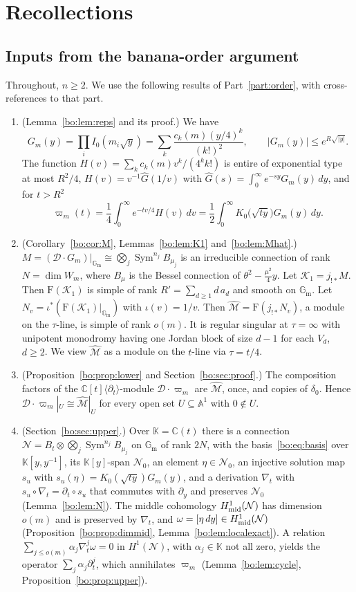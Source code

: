 \documentclass[11pt,a4paper]{article}
\theoremstyle{definition}
\theoremstyle{remark}
\numberwithin{equation}{section}
\newcommand{\C}{\mathbb{C}}
\newcommand{\Gm}{\mathbb{G}_{\mathrm{m}}}
\newcommand{\Kt}{\mathbb{K}}
\newcommand{\A}{\mathbb{A}}
\newcommand{\cD}{\mathcal{D}}
\newcommand{\cN}{\mathcal{N}}
\newcommand{\cM}{\mathcal{M}}
\newcommand{\Four}{\mathrm{F}}
\DeclareMathOperator{\Sym}{Sym}
\newcommand{\cK}{\mathcal{K}}
\newcommand{\Mhat}{\widehat{\cM}}
\begin{document}
\section{Recollections}\label{bs:sec:recall}

\subsection{Inputs from the banana-order argument}\label{bs:sec:partI}
Throughout, $n\ge2$. We use the following results of Part~\ref{part:order}, with cross-references to that part.
\begin{enumerate}
\item[(P1)] (Lemma~\ref{bo:lem:reps} and its proof.) We have
\[
G_m(y)=\prod_iI_0(m_i\sqrt y)=\sum_k\frac{c_k(m)(y/4)^k}{(k!)^2},\qquad |G_m(y)|\le e^{R\sqrt{|y|}}.
\] The function $H(v)=\sum_kc_k(m)v^k/(4^kk!)$ is entire of exponential type at most $R^2/4$, $H(v)=v^{-1}\widehat G(1/v)$ with $\widehat G(s)=\int_0^\infty e^{-sy}G_m(y)\,dy$, and for $t>R^2$
\[
\varpi_m(t)=\frac14\int_0^\infty e^{-tv/4}H(v)\,dv=\frac12\int_0^\infty K_0\bigl(\sqrt{ty}\bigr)G_m(y)\,dy .
\]
\item[(P2)] (Corollary~\ref{bo:cor:M}, Lemmas~\ref{bo:lem:K1} and~\ref{bo:lem:Mhat}.) $M=(\cD\cdot G_m)|_{\Gm}\cong\bigotimes_j\Sym^{n_j}B_{\mu_j}$ is an irreducible connection of rank $N=\dim W_m$, where $B_\mu$ is the Bessel connection of $\theta^2-\frac{\mu^2}{4}y$. Let $\cK_1=j_{!*}M$. Then $\Four(\cK_1)$ is simple of rank $R'=\sum_{d\ge1}d\,a_d$ and smooth on $\Gm$. Let $N_v=\iota^*(\Four(\cK_1)|_{\Gm})$ with $\iota(v)=1/v$. Then $\Mhat=\Four(j_{!*}N_v)$, a module on the $\tau$-line, is simple of rank $o(m)$. It is regular singular at $\tau=\infty$ with unipotent monodromy having one Jordan block of size $d-1$ for each $V_d$, $d\ge2$. We view $\Mhat$ as a module on the $t$-line via $\tau=t/4$.
\item[(P3)] (Proposition~\ref{bo:prop:lower} and Section~\ref{bo:sec:proof}.) The composition factors of the $\C[t]\langle\partial_t\rangle$-module $\cD\cdot\varpi_m$ are $\Mhat$, once, and copies of $\delta_0$. Hence $\cD\cdot\varpi_m|_U\cong\Mhat|_U$ for every open set $U\subseteq\A^1$ with $0\notin U$.
\item[(P4)] (Section~\ref{bo:sec:upper}.) Over $\Kt=\C(t)$ there is a connection $\cN=B_t\otimes\bigotimes_j\Sym^{n_j}B_{\mu_j}$ on $\Gm$ of rank $2N$, with the basis~\eqref{bo:eq:basis} over $\Kt[y,y^{-1}]$, its $\Kt[y]$-span $\cN_0$, an element $\eta\in\cN_0$, an injective solution map $s_u$ with $s_u(\eta)=K_0(\sqrt{ty})G_m(y)$, and a derivation $\nabla_t$ with $s_u\circ\nabla_t=\partial_t\circ s_u$ that commutes with $\partial_y$ and preserves $\cN_0$ (Lemma~\ref{bo:lem:N}). The middle cohomology $H^1_{\rm mid}(\cN)$ has dimension $o(m)$ and is preserved by $\nabla_t$, and $\omega=[\eta\,dy]\in H^1_{\rm mid}(\cN)$ (Proposition~\ref{bo:prop:dimmid}, Lemma~\ref{bo:lem:localexact}). A relation $\sum_{j\le o(m)}\alpha_j\nabla_t^j\omega=0$ in $H^1(\cN)$, with $\alpha_j\in\Kt$ not all zero, yields the operator $\sum_j\alpha_j\partial_t^j$, which annihilates $\varpi_m$ (Lemma~\ref{bo:lem:cycle}, Proposition~\ref{bo:prop:upper}).

\end{enumerate}
\end{document}
